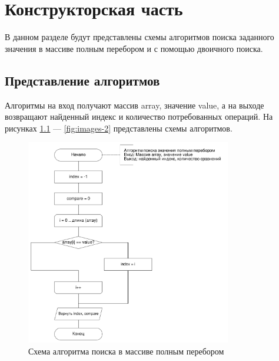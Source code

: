 \chapter{Конструкторская часть}
В данном разделе будут представлены схемы алгоритмов поиска заданного значения в массиве полным перебором и с помощью двоичного поиска.

\section{Представление алгоритмов}

Алгоритмы на вход получают массив array, значение value, а на выходе возвращают
найденный индекс и количество потребованных операций. На рисунках \ref{fig:images-1}
--- \ref{fig:images-2} представлены схемы алгоритмов.

\begin{figure}[h]
    \centering
    \includegraphics[width=0.8\textwidth]{images/1.png}
    \caption{Схема алгоритма поиска в массиве полным перебором}
    \label{fig:images-1}
\end{figure}

\clearpage

